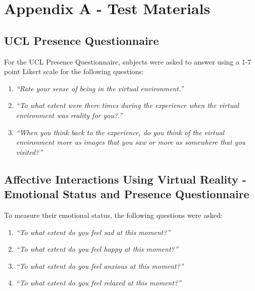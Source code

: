 \documentclass{sigchi}
\newcommand{\inlinequote}[1]{\textit{``#1''}}
\begin{document}
%
%
%
%
%
\balance{}

\balance{}




\appendix
\section{Appendix A - Test Materials}\label{Appendix_A}
\subsection{UCL Presence Questionnaire}
For the UCL Presence Questionnaire, subjects were asked to answer using a 1-7 point Likert scale for the following questions:
\begin{enumerate}
	\item{\inlinequote{Rate your sense of being in the virtual environment.}}
	\item{\inlinequote{To what extent were there times during the experience when the virtual environment was reality for you?.}}
	\item{\inlinequote{When you think back to the experience, do you think of the virtual environment more as images that you saw or more	as somewhere that you visited?}}
	\end{enumerate}

\subsection{Affective Interactions Using Virtual Reality - Emotional Status and Presence Questionnaire}
To measure their emotional status, the following questions were asked:
\begin{enumerate}
	\item{\inlinequote{To what extent do you feel sad at this moment?}}
	\item{\inlinequote{To what extent do you feel happy at this	moment?}}
	\item{\inlinequote{To what extent do you feel anxious at this moment?}}
	\item{\inlinequote{To what extent do you feel relaxed at this moment?}}
\end{enumerate}
\end{document}

